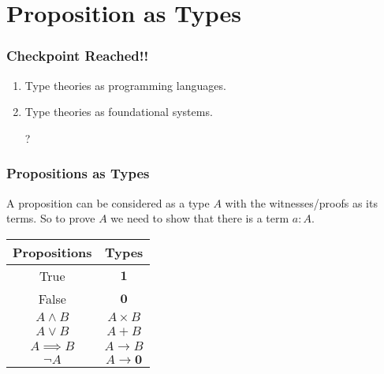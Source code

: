 \documentclass[14pt,compress]{beamer}
\begin{document}
\section{Proposition as Types}
\begin{frame}\label{frame : checkpoint}
\frametitle{Checkpoint Reached!!}

\begin{enumerate}
\pause
\item
Type theories as programming languages.
\pause
\textcolor{beamer@mathtext}
{\begin{Large}  \end{Large}}
\pause
\item
Type theories as foundational systems.
\textcolor{beamer@mathtext}
{\begin{Large} ? \end{Large}}
\end{enumerate}
\end{frame}
\begin{frame}\label{frame : prop as types}
\frametitle{Propositions as Types}

\pause
A proposition can be considered as a type \textcolor{beamer@mathtext}{$A$} with 
the witnesses/proofs as its terms.
\pause
So to prove \textcolor{beamer@mathtext}{$A$} we need to show that 
there is a term \textcolor{beamer@mathtext}{$a : A$}.

\pause
\color{beamer@mathtext}
\begin{table}
\begin{tabular}{ c | c }

\hline
Propositions & Types\\ 
\hline

True & $\mathbf{1}$ \\

False & $\mathbf{0}$ \\

$A \wedge B$ & $A \times B$ \\

$A \vee B$ & $A + B$ \\

$A \implies B$ & $A \to B$ \\

$\neg A$ & $A \to \mathbf{0}$ \\
\end{tabular}
\end{table}
\end{frame}
\end{document}
